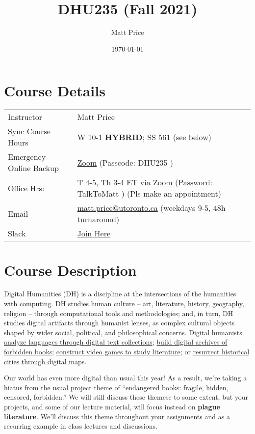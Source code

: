 \documentclass[11pt]{article}
\author{Matt Price}
\date{\today}
\title{DHU235 (Fall 2021)}
\begin{document}
\maketitle
\section*{Course Details}
\label{sec:org4a4c3a9}
\begin{center}
\begin{tabular}{ll}
Instructor & Matt Price\\
Sync Course Hours & W 10-1 \textbf{HYBRID}; SS 561 (see below)\\
Emergency Online Backup & \href{https://utoronto.zoom.us/j/87927835032}{Zoom} (Passcode: DHU235 )\\
Office Hrs: & T 4-5, Th 3-4 ET via \href{https://utoronto.zoom.us/j/94323465867}{Zoom} (Password: TalkToMatt ) (Pls make an appointment)\\
Email & \href{mailto:matt.price@utoronto.ca}{matt.price@utoronto.ca} (weekdays 9-5, 48h turnaround)\\
Slack & \href{https://join.slack.com/t/uoftdh/signup}{Join Here}\\
\end{tabular}
\end{center}

\section*{Course Description}
\label{sec:org4c622c2}
Digital Humanities (DH) is a discipline at the intersections of the humanities with computing.  DH studies human culture -- art, literature, history, geography, religion -- through computational tools and methodologies; and, in turn, DH studies digital artifacts through humanist lenses, as complex cultural objects shaped by wider social, political, and philosophical concerns. Digital humanists \href{http://www.doe.utoronto.ca}{analyze languages through digital text collections}; \href{https://samizdat.library.utoronto.ca/}{build digital archives of forbidden books}; \href{http://sites.utm.utoronto.ca/gillespie/content/welcome-book-fame}{construct video games to study literature}; or \href{https://decima-map.net/}{resurrect historical cities through digital maps}.

Our world has even more digital than usual this year! As a result, we're taking a hiatus from the usual project theme of ``endangered books: fragile, hidden, censored, forbidden.'' We will still discuss these themese to some extent, but your projects, and some of our lecture material, will focus instead on \textbf{plague literature}. We'll discuss this theme throughout your assignments and as a recurring example in class lectures and discussions. 
\end{document}
